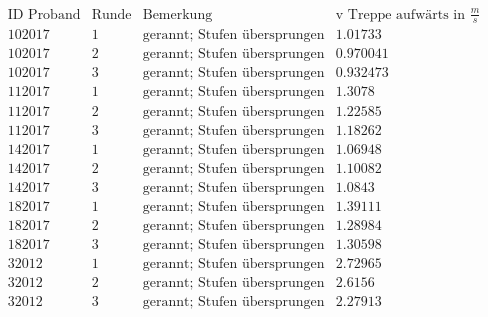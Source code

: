 \[\begin{array}{cccc}
 \text{ID Proband} & \text{Runde} & \text{Bemerkung} & \text{v Treppe aufw{\" a}rts in }\frac{m}{s} \\
 102017 & 1 & \text{gerannt; Stufen {\" u}bersprungen} & 1.01733 \\
 102017 & 2 & \text{gerannt; Stufen {\" u}bersprungen} & 0.970041 \\
 102017 & 3 & \text{gerannt; Stufen {\" u}bersprungen} & 0.932473 \\
 112017 & 1 & \text{gerannt; Stufen {\" u}bersprungen} & 1.3078 \\
 112017 & 2 & \text{gerannt; Stufen {\" u}bersprungen} & 1.22585 \\
 112017 & 3 & \text{gerannt; Stufen {\" u}bersprungen} & 1.18262 \\
 142017 & 1 & \text{gerannt; Stufen {\" u}bersprungen} & 1.06948 \\
 142017 & 2 & \text{gerannt; Stufen {\" u}bersprungen} & 1.10082 \\
 142017 & 3 & \text{gerannt; Stufen {\" u}bersprungen} & 1.0843 \\
 182017 & 1 & \text{gerannt; Stufen {\" u}bersprungen} & 1.39111 \\
 182017 & 2 & \text{gerannt; Stufen {\" u}bersprungen} & 1.28984 \\
 182017 & 3 & \text{gerannt; Stufen {\" u}bersprungen} & 1.30598 \\
 32012 & 1 & \text{gerannt; Stufen {\" u}bersprungen} & 2.72965 \\
 32012 & 2 & \text{gerannt; Stufen {\" u}bersprungen} & 2.6156 \\
 32012 & 3 & \text{gerannt; Stufen {\" u}bersprungen} & 2.27913 \\
\end{array}\]

